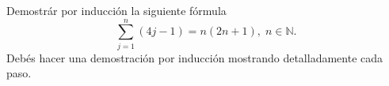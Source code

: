 \documentclass[a4paper,12pt,twoside,spanish]{amsbook}
\begin{document}

\begin{ejercicio}
	 Demostrár por inducción la siguiente fórmula
    \begin{equation*}
		\sum_{j=1}^{n}( 4j -1)  = n(2n+1) , \; n \in \mathbb N.
	\end{equation*}
    Debés hacer una demostración por inducción mostrando detalladamente cada paso. 

    
\end{ejercicio}

\begin{comment}
\begin{solucion}
	Se demostrará la fórmula por inducción sobre $n$.
	
	\textbf{Caso base.} $n=0$. En este caso  $\sum_{k=0}^{0} (2k +1)  = 2\cdot 0 +1 = 1$ y por otro lado $(0 +1)^2 = 1^2 =1$. Es decir el resultado vale para $n=0$.
	
	
	\vskip .4cm
	
	\textbf{Paso inductivo.} Debemos probar que si  vale
	\begin{equation*}
	\sum_{k=0}^{h} (2k +1) = (h+1)^2, \;  h \ge 0, \tag{HI}
	\end{equation*}
	entonces  
	\begin{equation*}
	\sum_{k=0}^{h+1} (2k +1) = ((h+1)+1)^2 = (h+2)^2.\tag{*}
	\end{equation*}
	\vskip .4cm
	Comenzamos por el lado izquierdo de (*):
	
	\begin{align*}
	\sum_{k=0}^{h+1} (2k +1)  &=   \sum_{k=0}^{h} (2k +1)  +  (2(h+1) +1)&&\text{ \;(por definición de sumatoria)\; } \\	
	&=   \sum_{k=0}^{h} (2k +1)  +  (2h+3)&&\\	
	&=   (h+1)^2 +  (2h+3)&&\text{ \;(por HI)\; } \\	
	&=   h^2 + 2h +1 + 2h+3&& \\	
	&=   h^2 + 4h +4&& \\
	&=   (h+2)^2&& \\	
	\end{align*}
	Esto  prueba (*).
\end{solucion}
	
\end{comment}
\end{document}

